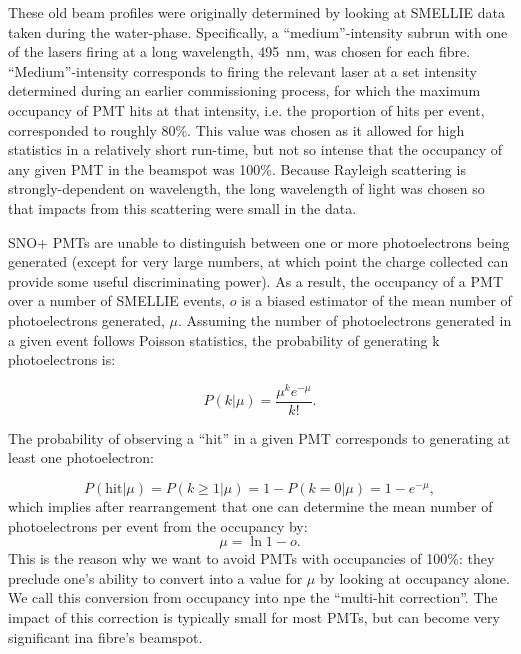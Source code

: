 These old beam profiles were originally determined by looking at SMELLIE data taken during the water-phase. Specifically, a ``medium''-intensity subrun with one of the lasers firing at a long wavelength, \SI{495}{\nano\metre}, was chosen for each fibre. ``Medium''-intensity corresponds to firing the relevant laser at a set intensity determined during an earlier commissioning process, for which the maximum occupancy of PMT hits at that intensity, i.e. the proportion of hits per event, corresponded to roughly 80\%. This value was chosen as it allowed for high statistics in a relatively short run-time, but not so intense that the occupancy of any given PMT in the beamspot was 100\%. Because Rayleigh scattering is strongly-dependent on wavelength, the long wavelength of light was chosen so that impacts from this scattering were small in the data.

SNO+ PMTs are unable to distinguish between one or more photoelectrons being generated (except for very large numbers, at which point the charge collected can provide some useful discriminating power). As a result, the occupancy of a PMT over a number of SMELLIE events, $o$ is a biased estimator of the mean number of photoelectrons generated, $\mu$. Assuming the number of photoelectrons generated in a given event follows Poisson statistics, the probability of generating k photoelectrons is:

\begin{equation}
    P\left(k | \mu\right) = \frac{\mu^{k}e^{-\mu}}{k!}.
\end{equation}

The probability of observing a ``hit'' in a given PMT corresponds to generating at least one photoelectron:

\begin{equation}\label{eq:p_hit}
    P\left(\text{hit}| \mu\right) = P\left(k\geq 1 | \mu\right) = 1 - P\left(k = 0 | \mu\right) = 1 - e^{-\mu},
\end{equation}
which implies after rearrangement that one can determine the mean number of photoelectrons per event from the occupancy by:
\begin{equation}\label{eq:multihit_correction}
    \mu = \ln{1 - o}.
\end{equation}
This is the reason why we want to avoid PMTs with occupancies of 100\%: they preclude one's ability to convert into a value for $\mu$ by looking at occupancy alone. We call this conversion from occupancy into npe the ``multi-hit correction''. The impact of this correction is typically small for most PMTs, but can become very significant ina fibre's beamspot.

